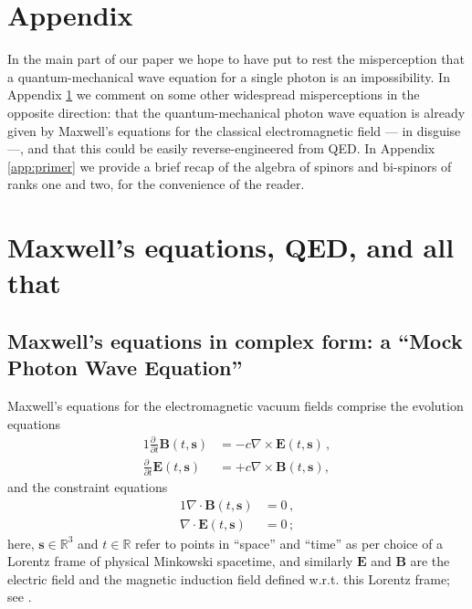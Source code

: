 \documentclass[12pt]{article}
\theoremstyle{definition}
\newcommand{\pddt}{\frac{\partial\phantom{t}}{\partial t}}
\newcommand{\vect}[1] {\boldsymbol{{ #1}} }
\newcommand{\sV}{{\vect{s}}}            %
\numberwithin{equation}{section}
\newcommand{\bB}{\mathbf{B}}
\newcommand{\bE}{\mathbf{E}}
\newcommand{\Rset}{{\mathbb R}}
\newcommand{\nab}{\nabla}
\begin{document}
\section*{Appendix}\vspace{-5pt}
\appendix

 In the main part of our paper we hope to have put to rest the misperception that a quantum-mechanical wave equation for
a single photon is an impossibility.
 In Appendix \ref{app:others} we comment on some other widespread misperceptions in the opposite direction:
 that the quantum-mechanical photon wave equation is already given by Maxwell's equations for the classical electromagnetic field
--- in disguise ---, and that this could be easily reverse-engineered from QED. 
 In Appendix \ref{app:primer} we provide a brief recap of the algebra of spinors and bi-spinors of ranks one and two, 
 for the convenience of the reader. \vspace{-10pt}

\section{Maxwell's equations, QED, and all that}\label{app:others}

\subsection{Maxwell's equations in complex form: a ``Mock Photon Wave Equation''}\vspace{-5pt}

 Maxwell's equations for the electromagnetic vacuum fields comprise the evolution equations
\begin{alignat}{1}
\textstyle
\pddt{\bB(t,\sV)}
&= \label{eq:MLdotB}
        -c\nab\times\bE(t,\sV) \, ,
\\
\textstyle
         \pddt{\bE(t,\sV)}
&= \label{eq:MLdotE}
        +c\nab\times\bB(t,\sV)  ,
\end{alignat}
and the constraint equations
\begin{alignat}{1}
\textstyle
        \nab\cdot \bB(t,\sV)  
&= \label{eq:MLdivB}
        0\, ,
\\
        \nab\cdot\bE(t,\sV)  
&=\label{eq:MLdivE}
       0\,;
\end{alignat}
here, 
$\sV\in\Rset^3$ and $t\in\Rset$ refer to points in ``space'' and ``time'' as per choice of a Lorentz frame of physical Minkowski 
spacetime, and similarly $\bE$ and $\bB$ are the electric field and the magnetic induction field defined w.r.t. this 
Lorentz frame; see \cite{JacksonBOOK}.
\end{document}
